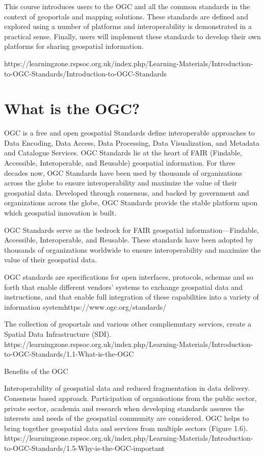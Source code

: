 \documentclass[class=scrbook, crop=false]{standalone}
\begin{document}
This course introduces users to the OGC and all the common standards in the context of geoportals and mapping solutions. These standards are defined and explored using a number of platforms and interoperability is demonstrated in a practical sense. Finally, users will implement these standards to develop their own platforms for sharing geospatial information.

https://learningzone.rspsoc.org.uk/index.php/Learning-Materials/Introduction-to-OGC-Standards/Introduction-to-OGC-Standards

\section{What is the OGC?}
OGC is a free and open geospatial Standards define interoperable approaches to Data Encoding, Data Access, Data Processing, Data Visualization, and Metadata and Catalogue Services.  OGC Standards lie at the heart of FAIR (Findable, Accessible, Interoperable, and Reusable) geospatial information. For three decades now, OGC Standards have been used by thousands of organizations across the globe to ensure interoperability and maximize the value of their geospatial data. Developed through consensus, and backed by government and organizations across the globe, OGC Standards provide the stable platform upon which geospatial innovation is built. 

OGC Standards serve as the bedrock for FAIR geospatial information—Findable, Accessible, Interoperable, and Reusable.
These standards have been adopted by thousands of organizations worldwide to ensure interoperability and maximize the value of their geospatial data.


OGC standards are specifications for open interfaces, protocols, schemas and so forth that enable different vendors' systems to exchange geospatial data and instructions, and that enable full integration of these capabilities into a variety of information systemhttps://www.ogc.org/standards/ 

The collection of geoportals and various other compliemntary services, create a Spatial Data Infrastructure (SDI).
https://learningzone.rspsoc.org.uk/index.php/Learning-Materials/Introduction-to-OGC-Standards/1.1-What-is-the-OGC

Benefits of the OGC

    Interoperability of geospatial data and reduced fragmentation in data delivery.
    Consensus based approach. Participation of organisations from the public sector, private sector, academia and research when developing standards assures the interests and needs of the geospatial community are considered.
    OGC helps to bring together geospatial data and services from multiple sectors (Figure 1.6).
    https://learningzone.rspsoc.org.uk/index.php/Learning-Materials/Introduction-to-OGC-Standards/1.5-Why-is-the-OGC-important
\end{document}
